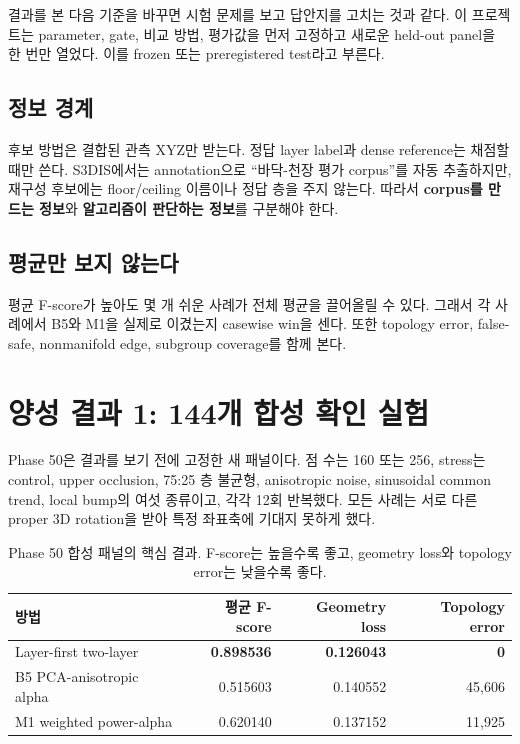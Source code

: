 \documentclass[11pt,a4paper]{article}
\begin{document}
결과를 본 다음 기준을 바꾸면 시험 문제를 보고 답안지를 고치는 것과 같다.
이 프로젝트는 parameter, gate, 비교 방법, 평가값을 먼저 고정하고 새로운
held-out panel을 한 번만 열었다. 이를 frozen 또는 preregistered test라고 부른다.

\subsection{정보 경계}

후보 방법은 결합된 관측 XYZ만 받는다. 정답 layer label과 dense reference는
채점할 때만 쓴다. S3DIS에서는 annotation으로 ``바닥-천장 평가 corpus''를
자동 추출하지만, 재구성 후보에는 floor/ceiling 이름이나 정답 층을 주지 않는다.
따라서 \textbf{corpus를 만드는 정보}와 \textbf{알고리즘이 판단하는 정보}를
구분해야 한다.

\subsection{평균만 보지 않는다}

평균 F-score가 높아도 몇 개 쉬운 사례가 전체 평균을 끌어올릴 수 있다.
그래서 각 사례에서 B5와 M1을 실제로 이겼는지 casewise win을 센다. 또한
topology error, false-safe, nonmanifold edge, subgroup coverage를 함께 본다.

\section{양성 결과 1: 144개 합성 확인 실험}

Phase 50은 결과를 보기 전에 고정한 새 패널이다. 점 수는 160 또는 256,
stress는 control, upper occlusion, 75:25 층 불균형, anisotropic noise,
sinusoidal common trend, local bump의 여섯 종류이고, 각각 12회 반복했다.
모든 사례는 서로 다른 proper 3D rotation을 받아 특정 좌표축에 기대지 못하게 했다.

\begin{table}[tbp]
\centering
\caption{Phase 50 합성 패널의 핵심 결과. F-score는 높을수록 좋고, geometry
loss와 topology error는 낮을수록 좋다.}
\small
\begin{tabularx}{\textwidth}{Xrrr}
\toprule
방법 & 평균 F-score & Geometry loss & Topology error \\
\midrule
Layer-first two-layer & \textbf{0.898536} & \textbf{0.126043} & \textbf{0} \\
B5 PCA-anisotropic alpha & 0.515603 & 0.140552 & 45,606 \\
M1 weighted power-alpha & 0.620140 & 0.137152 & 11,925 \\
\bottomrule
\end{tabularx}
\end{table}
\end{document}
